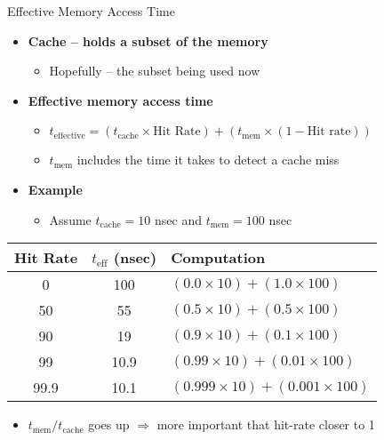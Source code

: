 \documentclass[aspectratio=169,12pt]{beamer}
\begin{document}
\begin{frame}{Effective Memory Access Time}
\begin{itemize}
  \item \textbf{Cache -- holds a subset of the memory}
  \begin{itemize}
    \item Hopefully -- the subset being used now
  \end{itemize}
  
  \item \textbf{Effective memory access time}
  \begin{itemize}
    \item $t_{\text{effective}} = (t_{\text{cache}} \times \text{Hit Rate}) + (t_{\text{mem}} \times (1 - \text{Hit rate}))$
    \item $t_{\text{mem}}$ includes the time it takes to detect a cache miss
  \end{itemize}
  
  \item \textbf{Example}
  \begin{itemize}
    \item Assume $t_{\text{cache}} = 10$ nsec and $t_{\text{mem}} = 100$ nsec
  \end{itemize}
\end{itemize}

\begin{center}
\begin{tabular}{c|c|l}
\textbf{Hit Rate} & \textbf{$t_{\text{eff}}$ (nsec)} & \textbf{Computation} \\
\hline
0 & 100 & $(0.0 \times 10) + (1.0 \times 100)$ \\
50 & 55 & $(0.5 \times 10) + (0.5 \times 100)$ \\
90 & 19 & $(0.9 \times 10) + (0.1 \times 100)$ \\
99 & 10.9 & $(0.99 \times 10) + (0.01 \times 100)$ \\
99.9 & 10.1 & $(0.999 \times 10) + (0.001 \times 100)$ \\
\end{tabular}
\end{center}

\begin{itemize}
  \item $t_{\text{mem}}/t_{\text{cache}}$ goes up $\Rightarrow$ more important that hit-rate closer to 1
\end{itemize}
\end{frame}
\end{document}
